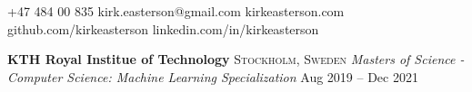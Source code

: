 \documentclass[10pt,letterpaper]{article}
\begin{document}


\begin{center}\spacedhrule{-.6em}{-.6em}\end{center}
\small +47 484 00 835 \hfill{}\hfill kirk.easterson@gmail.com \hfill{}\hfill kirkeasterson.com \hfill{}\hfill github.com/kirkeasterson \hfill{}\hfill linkedin.com/in/kirkeasterson
\begin{center}\spacedhrule{-.4em}{-1.3em}\end{center}













\headedsection
{\textbf{KTH Royal Institue of Technology}}
{\textsc{Stockholm, Sweden}} {
	\headedsubsection
	{\textit{Masters of Science - Computer Science: Machine Learning Specialization}}
	{Aug 2019 -- Dec 2021}
	{\bodytext{}}
}
\vspace{-5mm}
\end{document}
